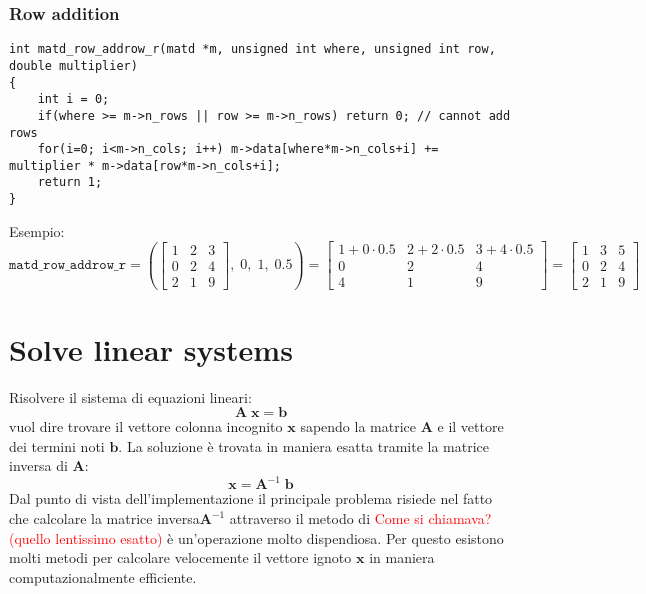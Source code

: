 \documentclass[10pt]{article}
\begin{document}
\subsubsection{Row addition}

\begin{lstlisting}
int matd_row_addrow_r(matd *m, unsigned int where, unsigned int row, double multiplier)
{
	int i = 0;
	if(where >= m->n_rows || row >= m->n_rows) return 0; // cannot add rows
	for(i=0; i<m->n_cols; i++) m->data[where*m->n_cols+i] += multiplier * m->data[row*m->n_cols+i];
	return 1;
}
\end{lstlisting}

Esempio:
\begin{equation*}
\mathtt{matd\_row\_addrow\_r} = \left( 
\begin{bmatrix}
1 & 2 & 3 \\ 0 & 2 & 4 \\ 2 & 1 & 9
\end{bmatrix}, \; 0, \; 1, \; 0.5
\right) = 
\begin{bmatrix}
1+0\cdot 0.5 & 2+2\cdot 0.5 & 3+4\cdot 0.5 \\
0 & 2 & 4 \\
4 & 1 & 9
\end{bmatrix} = 
\begin{bmatrix}
1 & 3 & 5 \\ 0 & 2 & 4 \\ 2 & 1 & 9
\end{bmatrix}
\end{equation*}



\section{Solve linear systems}

Risolvere il sistema di equazioni lineari:
\begin{equation}
\mathbf{A} \; \mathbf{x} = \mathbf{b}
\end{equation}
vuol dire trovare il vettore colonna incognito $\mathbf{x}$ sapendo la matrice $\mathbf{A}$ e il vettore dei termini noti $\mathbf{b}$. La soluzione è trovata in maniera esatta tramite la matrice inversa di $\mathbf{A}$:
\begin{equation}
\mathbf{x} = \mathbf{A}^{-1} \; \mathbf{b}
\end{equation}
Dal punto di vista dell'implementazione il principale problema risiede nel fatto che calcolare la matrice inversa$\mathbf{A}^{-1}$ attraverso il metodo di \textcolor{red}{Come si chiamava? (quello lentissimo esatto)} è un'operazione molto dispendiosa.
Per questo esistono molti metodi per calcolare velocemente il vettore ignoto $\mathbf{x}$ in maniera computazionalmente efficiente.
\end{document}
